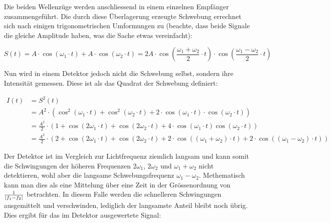 Die beiden  Wellenz\"uge werden  anschliessend in einem  einzelnen Empf\"anger
zusammengef\"uhrt. Die durch diese \"Uberlagerung erzeugte Schwebung errechnet
sich  nach  einigen  trigonometrischen  Umformungen zu  (beachte,  dass  beide
Signale die gleiche Amplitude haben, was die Sache etwas vereinfacht):

\begin{equation}
    \label{eq:schwebung}
    S(t) = A \cdot \cos(\omega_1 \cdot t) + A \cdot \cos(\omega_2 \cdot t)
         = 2 A \cdot
             \cos\left(
                 \frac{\omega_1 + \omega_2}{2} \cdot t
             \right)
             \cdot
             \cos\left(
                 \frac{\omega_1 - \omega_2}{2} \cdot t
             \right)
\end{equation}

Nun wird  in einem Detektor  jedoch nicht  die Schwebung selbst,  sondern ihre
Intensit\"at gemessen. Diese ist als das Quadrat der Schwebung definiert:

\begin{equation}
    \label{eq:intensity}
    \begin{split}
        I(t) &= S^2(t) \\
             &= A^2           \cdot \left( \cos^2(\omega_1 \cdot t) + \cos^2(\omega_2 \cdot t) + 2 \cdot \cos(\omega_1 \cdot t) \cdot \cos(\omega_2 \cdot t) \right) \\
             &= \frac{A^2}{2} \cdot \left( 1 + \cos(2\omega_1 \cdot t) + \cos(2\omega_2 \cdot t) + 4 \cdot \cos(\omega_1 \cdot t)\cos(\omega_2 \cdot t) \right) \\
             &= \frac{A^2}{2} \cdot \left( 2 + \cos(2\omega_1 \cdot t) + \cos(2\omega_2 \cdot t) + 2 \cdot \cos\left((\omega_1 + \omega_2) \cdot t \right) + 2 \cdot \cos\left( (\omega_1 - \omega_2) \cdot t \right) \right)
    \end{split}
\end{equation}

Der  Detektor ist  im Vergleich  zur Lichtfrequenz  ziemlich langsam  und kann
somit  die  Schwingungen  der h\"oheren  Frequenzen  $2\omega_1$,  $2\omega_2$
und  $\omega_1  +   \omega_2$  nicht  detektieren,  wohl   aber  die  langsame
Schwebungsfrequenz $\omega_1 - \omega_2$. Methematisch  kann man dies als eine
Mittelung \"uber  eine Zeit in  der Gr\"ossenordnung von  $\frac{1}{\lvert f_1 -
f_2\rvert}$  betrachten.   In  diesem  Falle werden  die  schnelleren  Schwingungen
ausgemittelt  und verschwinden,  lediglich der  langsamste Anteil  bleibt noch
\"ubrig. Dies ergibt f\"ur das im Detektor ausgewertete Signal:

